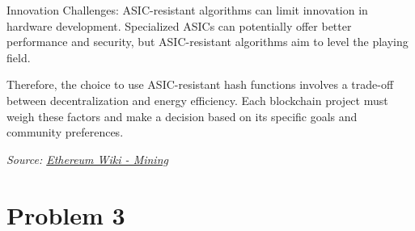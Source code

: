 \documentclass{article}
\begin{document}
\begin{enumerate}
Innovation Challenges: ASIC-resistant algorithms can limit innovation in hardware development. Specialized ASICs can potentially offer better performance and security, but ASIC-resistant algorithms aim to level the playing field.

Therefore, the choice to use ASIC-resistant hash functions involves a trade-off between decentralization and energy efficiency. Each blockchain project must weigh these factors and make a decision based on its specific goals and community preferences.

\emph{Source: \href{https://eth.wiki/concepts/mining}{Ethereum Wiki - Mining}}
    
\end{enumerate}
\section*{Problem 3}
\end{document}
